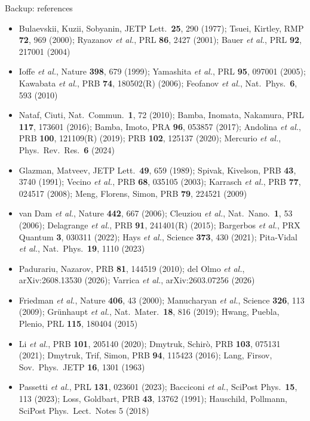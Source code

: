 \documentclass[aspectratio=169,9pt]{beamer}
\begin{document}
\begin{frame}{Backup: references}
  \scriptsize
  \begin{itemize}
    \item Bulaevskii, Kuzii, Sobyanin, JETP Lett.\ \textbf{25}, 290 (1977); Tsuei, Kirtley, RMP \textbf{72}, 969 (2000);
          Ryazanov \emph{et al.}, PRL \textbf{86}, 2427 (2001); Bauer \emph{et al.}, PRL \textbf{92}, 217001 (2004)
    \item Ioffe \emph{et al.}, Nature \textbf{398}, 679 (1999); Yamashita \emph{et al.}, PRL \textbf{95}, 097001 (2005);
          Kawabata \emph{et al.}, PRB \textbf{74}, 180502(R) (2006); Feofanov \emph{et al.}, Nat.\ Phys.\ \textbf{6}, 593 (2010)
    \item Nataf, Ciuti, Nat.\ Commun.\ \textbf{1}, 72 (2010); Bamba, Inomata, Nakamura, PRL \textbf{117}, 173601 (2016);
          Bamba, Imoto, PRA \textbf{96}, 053857 (2017); Andolina \emph{et al.}, PRB \textbf{100}, 121109(R) (2019); PRB \textbf{102}, 125137 (2020);
          Mercurio \emph{et al.}, Phys.\ Rev.\ Res.\ \textbf{6} (2024)
    \item Glazman, Matveev, JETP Lett.\ \textbf{49}, 659 (1989); Spivak, Kivelson, PRB \textbf{43}, 3740 (1991);
          Vecino \emph{et al.}, PRB \textbf{68}, 035105 (2003); Karrasch \emph{et al.}, PRB \textbf{77}, 024517 (2008);
          Meng, Florens, Simon, PRB \textbf{79}, 224521 (2009)
    \item van Dam \emph{et al.}, Nature \textbf{442}, 667 (2006); Cleuziou \emph{et al.}, Nat.\ Nano.\ \textbf{1}, 53 (2006);
          Delagrange \emph{et al.}, PRB \textbf{91}, 241401(R) (2015); Bargerbos \emph{et al.}, PRX Quantum \textbf{3}, 030311 (2022);
          Hays \emph{et al.}, Science \textbf{373}, 430 (2021); Pita-Vidal \emph{et al.}, Nat.\ Phys.\ \textbf{19}, 1110 (2023)
    \item Padurariu, Nazarov, PRB \textbf{81}, 144519 (2010); del Olmo \emph{et al.}, arXiv:2608.13530 (2026); Varrica \emph{et al.}, arXiv:2603.07256 (2026)
    \item Friedman \emph{et al.}, Nature \textbf{406}, 43 (2000); Manucharyan \emph{et al.}, Science \textbf{326}, 113 (2009);
          Gr\"unhaupt \emph{et al.}, Nat.\ Mater.\ \textbf{18}, 816 (2019); Hwang, Puebla, Plenio, PRL \textbf{115}, 180404 (2015)
    \item Li \emph{et al.}, PRB \textbf{101}, 205140 (2020); Dmytruk, Schir\`o, PRB \textbf{103}, 075131 (2021);
          Dmytruk, Trif, Simon, PRB \textbf{94}, 115423 (2016); Lang, Firsov, Sov.\ Phys.\ JETP \textbf{16}, 1301 (1963)
    \item Passetti \emph{et al.}, PRL \textbf{131}, 023601 (2023); Bacciconi \emph{et al.}, SciPost Phys.\ \textbf{15}, 113 (2023);
          Loss, Goldbart, PRB \textbf{43}, 13762 (1991); Hauschild, Pollmann, SciPost Phys.\ Lect.\ Notes 5 (2018)
  \end{itemize}
\end{frame}
\end{document}
